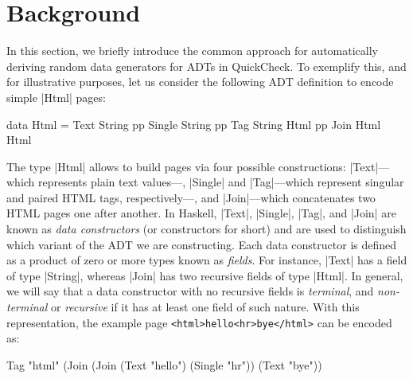 \section{Background} \label{sec:randomtesting}

In this section, we briefly introduce the common approach for automatically
deriving random data generators for ADTs in QuickCheck.
%
%
%
To exemplify this, and for illustrative purposes, let us consider the following
ADT definition to encode simple |Html| pages:
%
\begin{code}
data Html  =   Text    String
           pp  Single  String
           pp  Tag     String  Html
           pp  Join    Html    Html

\end{code}
%
The type |Html| allows to build pages via four possible constructions:
|Text|---which represents plain text values---, |Single| and |Tag|---which
represent singular and paired HTML tags, respectively---, and |Join|---which
concatenates two HTML pages one after another.
%
In Haskell, |Text|, |Single|, |Tag|, and |Join| are known as \emph{data
  constructors} (or constructors for short) and are used to distinguish which
variant of the ADT we are constructing.
%
Each data constructor is defined as a product of zero or more types known as
\emph{fields}.
%
For instance, |Text| has a field of type |String|, whereas |Join| has two
recursive fields of type |Html|.
%
In general, we will say that a data constructor with no recursive fields is
\emph{terminal}, and \emph{non-terminal} or \emph{recursive} if it has at least
one field of such nature.
%
With this representation, the example page \texttt{<html>hello<hr>bye</html>}
can be encoded as:
%
\begin{code}
Tag "html" (Join (Join
  (Text "hello") (Single "hr")) (Text "bye"))
\end{code}
%

